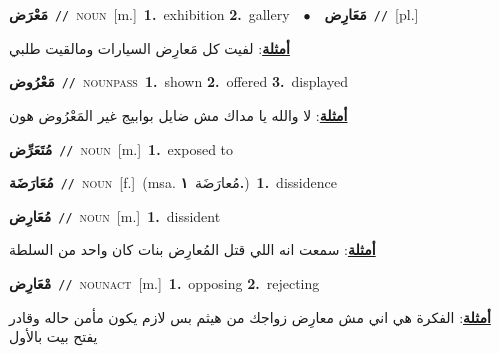 \documentclass[10pt,a4paper,twoside]{article} %
\begin{document}
\begin{multicols}{2}
{\setlength\topsep{0pt}\textbf{\foreignlanguage{arabic}{مَعْرَض}}\ {\color{gray}\texttt{//}\color{black}}\ \textsc{noun}\ [m.]\ \textbf{1.}~exhibition  \textbf{2.}~gallery\ \ $\bullet$\ \ \setlength\topsep{0pt}\textbf{\foreignlanguage{arabic}{مَعَارِض}}\ {\color{gray}\texttt{//}\color{black}}\ [pl.]\  \begin{flushright}\color{gray}\foreignlanguage{arabic}{\textbf{\underline{\foreignlanguage{arabic}{أمثلة}}}: لفيت كل مَعارِض السيارات ومالقيت طلبي}\end{flushright}\color{black}} \vspace{2mm}

{\setlength\topsep{0pt}\textbf{\foreignlanguage{arabic}{مَعْرُوض}}\ {\color{gray}\texttt{//}\color{black}}\ \textsc{noun\textunderscore pass}\ \textbf{1.}~shown  \textbf{2.}~offered  \textbf{3.}~displayed\  \begin{flushright}\color{gray}\foreignlanguage{arabic}{\textbf{\underline{\foreignlanguage{arabic}{أمثلة}}}: لا والله يا مداك مش ضايل بوابيج غير المَعْرُوض هون}\end{flushright}\color{black}} \vspace{2mm}

{\setlength\topsep{0pt}\textbf{\foreignlanguage{arabic}{مُتَعَرِّض}}\ {\color{gray}\texttt{//}\color{black}}\ \textsc{noun}\ [m.]\ \textbf{1.}~exposed to\ } \vspace{2mm}

{\setlength\topsep{0pt}\textbf{\foreignlanguage{arabic}{مُعَارَضَة}}\ {\color{gray}\texttt{//}\color{black}}\ \textsc{noun}\ [f.]\ \color{gray}(msa. \foreignlanguage{arabic}{مُعارَضَة}~\foreignlanguage{arabic}{\textbf{١.}})\color{black}\ \textbf{1.}~dissidence\ } \vspace{2mm}

{\setlength\topsep{0pt}\textbf{\foreignlanguage{arabic}{مُعَارِض}}\ {\color{gray}\texttt{//}\color{black}}\ \textsc{noun}\ [m.]\ \textbf{1.}~dissident\  \begin{flushright}\color{gray}\foreignlanguage{arabic}{\textbf{\underline{\foreignlanguage{arabic}{أمثلة}}}: سمعت انه اللي قتل المُعارِض بنات كان واحد من السلطة}\end{flushright}\color{black}} \vspace{2mm}

{\setlength\topsep{0pt}\textbf{\foreignlanguage{arabic}{مْعَارِض}}\ {\color{gray}\texttt{//}\color{black}}\ \textsc{noun\textunderscore act}\ [m.]\ \textbf{1.}~opposing  \textbf{2.}~rejecting\  \begin{flushright}\color{gray}\foreignlanguage{arabic}{\textbf{\underline{\foreignlanguage{arabic}{أمثلة}}}: الفكرة هي اني مش معارِض زواجك من هيثم بس لازم يكون مأمن حاله وقادر يفتح بيت بالأول}\end{flushright}\color{black}} \vspace{2mm}


\end{multicols}
\end{document}
